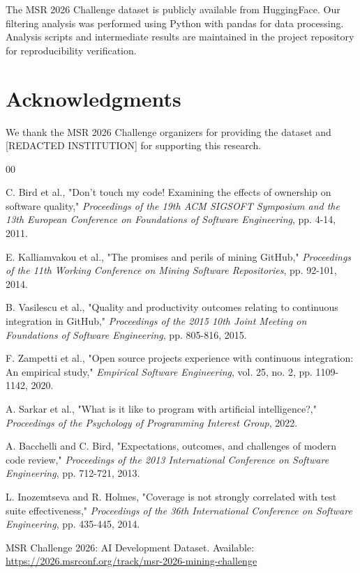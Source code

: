 \documentclass[conference]{IEEEtran}
\begin{document}
The MSR 2026 Challenge dataset is publicly available from HuggingFace. Our filtering analysis was performed using Python with pandas for data processing. Analysis scripts and intermediate results are maintained in the project repository for reproducibility verification.

\section*{Acknowledgments}

We thank the MSR 2026 Challenge organizers for providing the dataset and [REDACTED INSTITUTION] for supporting this research.

\balance
\begin{thebibliography}{00}

 C. Bird et al., "Don't touch my code! Examining the effects of ownership on software quality," \textit{Proceedings of the 19th ACM SIGSOFT Symposium and the 13th European Conference on Foundations of Software Engineering}, pp. 4-14, 2011.

 E. Kalliamvakou et al., "The promises and perils of mining GitHub," \textit{Proceedings of the 11th Working Conference on Mining Software Repositories}, pp. 92-101, 2014.

 B. Vasilescu et al., "Quality and productivity outcomes relating to continuous integration in GitHub," \textit{Proceedings of the 2015 10th Joint Meeting on Foundations of Software Engineering}, pp. 805-816, 2015.

 F. Zampetti et al., "Open source projects experience with continuous integration: An empirical study," \textit{Empirical Software Engineering}, vol. 25, no. 2, pp. 1109-1142, 2020.

 A. Sarkar et al., "What is it like to program with artificial intelligence?," \textit{Proceedings of the Psychology of Programming Interest Group}, 2022.

 A. Bacchelli and C. Bird, "Expectations, outcomes, and challenges of modern code review," \textit{Proceedings of the 2013 International Conference on Software Engineering}, pp. 712-721, 2013.

 L. Inozemtseva and R. Holmes, "Coverage is not strongly correlated with test suite effectiveness," \textit{Proceedings of the 36th International Conference on Software Engineering}, pp. 435-445, 2014.

 MSR Challenge 2026: AI Development Dataset. Available: \url{https://2026.msrconf.org/track/msr-2026-mining-challenge}

\end{thebibliography}
\end{document}
